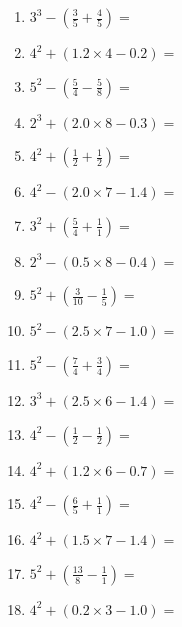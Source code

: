 \documentclass[12pt]{article}
\begin{document}
\begin{enumerate}
\item \large $ 3^{3} - (\frac{3}{5} + \frac{4}{5}) = $ \vspace{1.6cm}
\item \large $ 4^{2} + (1.2 \times 4 - 0.2) = $ \vspace{1.6cm}
\item \large $ 5^{2} - (\frac{5}{4} - \frac{5}{8}) = $ \vspace{1.6cm}
\item \large $ 2^{3} + (2.0 \times 8 - 0.3) = $ \vspace{1.6cm}
\newpage
\item \large $ 4^{2} + (\frac{1}{2} + \frac{1}{2}) = $ \vspace{1.6cm}
\item \large $ 4^{2} - (2.0 \times 7 - 1.4) = $ \vspace{1.6cm}
\item \large $ 3^{2} + (\frac{5}{4} + \frac{1}{1}) = $ \vspace{1.6cm}
\item \large $ 2^{3} - (0.5 \times 8 - 0.4) = $ \vspace{1.6cm}
\item \large $ 5^{2} + (\frac{3}{10} - \frac{1}{5}) = $ \vspace{1.6cm}
\item \large $ 5^{2} - (2.5 \times 7 - 1.0) = $ \vspace{1.6cm}
\item \large $ 5^{2} - (\frac{7}{4} + \frac{3}{4}) = $ \vspace{1.6cm}
\item \large $ 3^{3} + (2.5 \times 6 - 1.4) = $ \vspace{1.6cm}
\item \large $ 4^{2} - (\frac{1}{2} - \frac{1}{2}) = $ \vspace{1.6cm}
\item \large $ 4^{2} + (1.2 \times 6 - 0.7) = $ \vspace{1.6cm}
\newpage
\item \large $ 4^{2} - (\frac{6}{5} + \frac{1}{1}) = $ \vspace{1.6cm}
\item \large $ 4^{2} + (1.5 \times 7 - 1.4) = $ \vspace{1.6cm}
\item \large $ 5^{2} + (\frac{13}{8} - \frac{1}{1}) = $ \vspace{1.6cm}
\item \large $ 4^{2} + (0.2 \times 3 - 1.0) = $ \vspace{1.6cm}

\end{enumerate}
\end{document}
